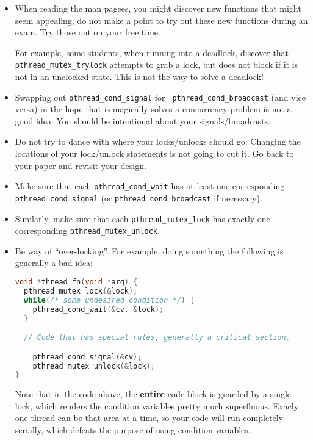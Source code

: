 \documentclass[11pt,usletter]{article}
\begin{document}
\begin{itemize}
  \item When reading the man pagees, you might discover new functions that
    might seem appealing, do not make a point to try out these new functions
    during an exam. Try those out on your free time.

    For example, some students, when running into a deadlock, discover that
    {\tt pthread\_mutex\_trylock} attempts to grab a lock, but does not block
    if it is not in an unclocked state. This is not the way to solve a
    deadlock!

  \item Swapping out {\tt pthread\_cond\_signal} for {\tt
    pthread\_cond\_broadcast} (and vice versa) in the hope that is magically
    solves a concurrency problem is not a good idea. You should be intentional
    about your signals/broadcasts.

  \item Do not try to dance with where your locks/unlocks should go. Changing
    the locations of your lock/unlock statements is not going to cut it. Go
    back to your paper and revisit your design.

  \item Make sure that each {\tt pthread\_cond\_wait} has at least one
    corresponding {\tt pthread\_cond\_signal} (or {\tt pthread\_cond\_broadcast}
    if necessary).

  \item Similarly, make sure that each {\tt pthread\_mutex\_lock} has exactly
    one corresponding {\tt pthread\_mutex\_unlock}.


  \item Be way of ``over-locking''. For example, doing something the following
    is generally a bad idea:

    \begin{lstlisting}[style=netseclab,language=c]
void *thread_fn(void *arg) {
  pthread_mutex_lock(&lock);
  while(/* some undesired condition */) {
    pthread_cond_wait(&cv, &lock);
  }

  // Code that has special rules, generally a critical section.

    pthread_cond_signal(&cv);
    pthread_mutex_unlock(&lock);
}
    \end{lstlisting}

    Note that in the code above, the {\bf entire} code block is guarded by a
    single lock, which renders the condition variables pretty much superfluous.
    Exacly one thread can be that area at a time, so your code will run
    completely serially, which defeats the purpose of using condition
    variables.


\end{itemize}
\end{document}
